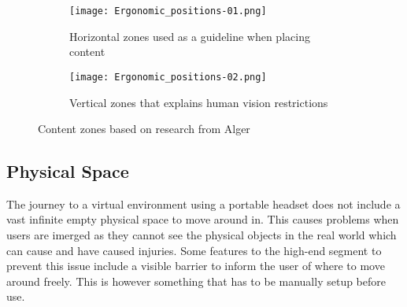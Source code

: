 
\begin{figure}
  \begin{subfigure}{.5\textwidth}
  \centering
  \texttt{[image: Ergonomic\_positions-01.png]}
\caption{Horizontal zones used as a guideline when placing content}
\label{fig:theory:issues:zones:hori}
  \end{subfigure}%
  \begin{subfigure}{.5\textwidth}
    \centering
    \texttt{[image: Ergonomic\_positions-02.png]}
    \caption{Vertical zones that explains human vision restrictions}
    \label{fig:theory:issues:zones:verti}
\end{subfigure}
\caption{Content zones based on research from Alger\cite{UX:Alger2015}}
\label{fig:theory:issues:zones}
\end{figure}



\subsection{Physical Space}
The journey to a virtual environment using a portable headset does not include a vast infinite empty physical space to move around in. This causes problems when users are imerged as they cannot see the physical objects in the real world which can cause and have caused injuries\cite{VR_injuries:2_allen_2017,VR_injuries:steamed}. Some features to the high-end segment to prevent this issue include a visible barrier to inform the user of where to move around freely. This is however something that has to be manually setup before use.\cite{VR_injuries:6_machkovech_2017}
